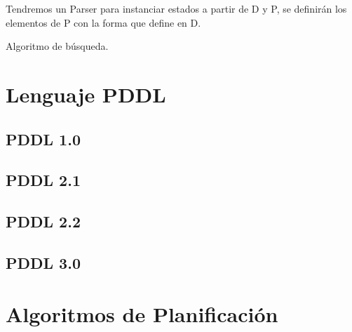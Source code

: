 \documentclass[12pt, twoside, openright]{report} %
\begin{document}
Tendremos un Parser para instanciar estados a partir de D y P, se definirán los elementos de P con la forma que define en D. 

Algoritmo de búsqueda.

\section{Lenguaje PDDL}

\subsection{PDDL 1.0}

\subsection{PDDL 2.1}

\subsection{PDDL 2.2}

\subsection{PDDL 3.0}

\section{Algoritmos de Planificación}
\end{document}
